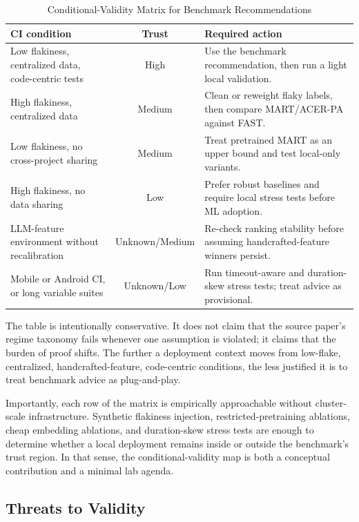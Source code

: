 \documentclass[10pt,conference]{IEEEtran}
\begin{document}
\begin{table}[htbp]
\centering
\caption{Conditional-Validity Matrix for Benchmark Recommendations}
\label{tab:validity_matrix}
\begin{tabularx}{\textwidth}{@{} >{\raggedright\arraybackslash}p{} c >{\raggedright\arraybackslash}X @{}}
\toprule
\textbf{CI condition} & \textbf{Trust} & \textbf{Required action} \\
\midrule
Low flakiness, centralized data, code-centric tests & High & Use the benchmark recommendation, then run a light local validation. \\
High flakiness, centralized data & Medium & Clean or reweight flaky labels, then compare MART/ACER-PA against FAST. \\
Low flakiness, no cross-project sharing & Medium & Treat pretrained MART as an upper bound and test local-only variants. \\
High flakiness, no data sharing & Low & Prefer robust baselines and require local stress tests before ML adoption. \\
LLM-feature environment without recalibration & Unknown/Medium & Re-check ranking stability before assuming handcrafted-feature winners persist. \\
Mobile or Android CI, or long variable suites & Unknown/Low & Run timeout-aware and duration-skew stress tests; treat advice as provisional. \\
\bottomrule
\end{tabularx}
\end{table}

The table is intentionally conservative. It does not claim that the source paper's regime taxonomy fails whenever one assumption is violated; it claims that the burden of proof shifts. The further a deployment context moves from low-flake, centralized, handcrafted-feature, code-centric conditions, the less justified it is to treat benchmark advice as plug-and-play.

Importantly, each row of the matrix is empirically approachable without cluster-scale infrastructure. Synthetic flakiness injection, restricted-pretraining ablations, cheap embedding ablations, and duration-skew stress tests are enough to determine whether a local deployment remains inside or outside the benchmark's trust region. In that sense, the conditional-validity map is both a conceptual contribution and a minimal lab agenda.

\subsection{Threats to Validity}
\end{document}
